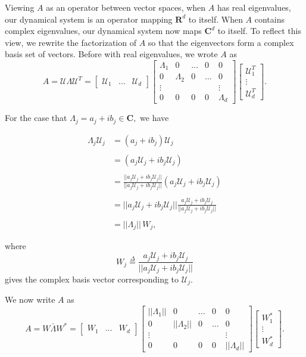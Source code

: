 Viewing $A$ as an operator between vector spaces, when $A$ has real eigenvalues, our dynamical system is an operator mapping $\mathbf{R}^{d}$ to itself.  When $A$ contains complex eigenvalues, our dynamical system now maps $\mathbf{C}^{d}$ to itself. To reflect this view, we rewrite the factorization of $A$ so that the eigenvectors form a complex basis set of vectors. Before with real eigenvalues, we wrote $A$ as 
$$
A = \mathcal{U} \Lambda \mathcal{U}^T = 
\begin{bmatrix}
\mathcal{U}_1 & \hdots  & \mathcal{U}_d
\end{bmatrix}
\begin{bmatrix}
\Lambda_1 & 0 & \hdots &0  & 0
\\
0 & \Lambda_2 & 0 & \hdots & 0
\\
\vdots & & & & \vdots
\\
 0& 0  & 0 & 0 & \Lambda_d
 \end{bmatrix}
 \begin{bmatrix}
\mathcal{U}_1^T \\ \vdots  \\ \mathcal{U}_d^T
\end{bmatrix}.
$$

For the case that $\Lambda_j = a_j + ib_j \in \mathbf{C},$ we have

\begin{align*}
\Lambda_j \mathcal{U}_j 
&=
\left(a_j + ib_j\right) \mathcal{U}_j
\\
\\
&= 
\left(a_j \mathcal{U}_j + ib_j \mathcal{U}_j\right)
\\
\\
&=
\frac{||a_j \mathcal{U}_j + ib_j \mathcal{U}_j||}
{||a_j \mathcal{U}_j + ib_j \mathcal{U}_j||}
\left(a_j \mathcal{U}_j + ib_j \mathcal{U}_j\right)
\\
\\
&= 
||a_j \mathcal{U}_j + ib_j \mathcal{U}_j||
\frac
{a_j \mathcal{U}_j + ib_j \mathcal{U}_j}
{||a_j \mathcal{U}_j + ib_j \mathcal{U}_j||}
\\
\\
&=
||\Lambda_j|| \, W_j,
\end{align*}

where 
$$ W_j \overset{\Delta}{=} \frac
{a_j \mathcal{U}_j + ib_j \mathcal{U}_j}
{||a_j \mathcal{U}_j + ib_j \mathcal{U}_j||}
$$
gives the complex basis vector corresponding to $\mathcal{U}_j$.

We now write $A$ as 
$$
A = 
W \bar{\Lambda} W^*
=
\begin{bmatrix}
W_1 & \hdots  & W_d
\end{bmatrix}
\begin{bmatrix}
||\Lambda_1|| & 0 & \hdots &0  & 0
\\
0 & ||\Lambda_2|| & 0 & \hdots & 0
\\
\vdots & & & & \vdots
\\
 0& 0  & 0 & 0 & ||\Lambda_d||
 \end{bmatrix}
 \begin{bmatrix}
W_1^* \\ \vdots  \\ W_d^*
\end{bmatrix}.
$$

